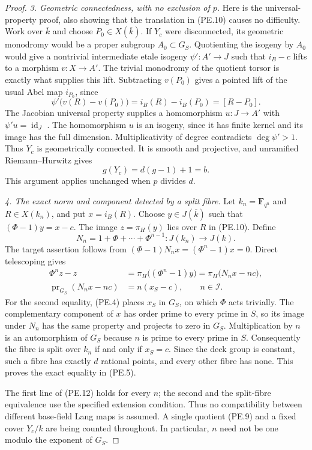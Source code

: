 \documentclass[11pt,a4paper]{article}
\begin{document}
\begin{proof}
\emph{3. Geometric connectedness, with no exclusion of $p$.}
Here is the universal-property proof, also showing that the
translation in (PE.10) causes no difficulty. Work over
$\overline k$ and choose $P_0\in X(\overline k)$.
If $Y_c$ were disconnected, its geometric monodromy would be a
proper subgroup $A_0\subset G_S$. Quotienting the isogeny by
$A_0$ would give a nontrivial intermediate etale isogeny
$\psi':A'\to J$ such that $i_B-c$ lifts to a morphism
$v:X\to A'$. The trivial monodromy of the quotient torsor is
exactly what supplies this lift. Subtracting $v(P_0)$ gives a
pointed lift of the usual Abel map $i_{P_0}$, since
\[
 \psi'\bigl(v(R)-v(P_0)\bigr)=i_B(R)-i_B(P_0)=[R-P_0].
\]
The Jacobian universal property supplies a homomorphism
$u:J\to A'$ with $\psi'u=\operatorname{id}_J$
\cite[Proposition~6.1, pp.~19--20]{MilneJV}.
The homomorphism $u$ is an isogeny, since it has finite kernel
and its image has the full dimension. Multiplicativity of degree
contradicts $\deg\psi'>1$. Thus $Y_c$ is geometrically connected.
It is smooth and projective, and unramified Riemann--Hurwitz gives
\[
                              g(Y_c)=d(g-1)+1=b.
 \tag{PE.11}
\]
This argument applies unchanged when $p$ divides $d$.

\emph{4. The exact norm and component detected by a split fibre.}
Let $k_n=\mathbf F_{q^n}$ and $R\in X(k_n)$, and put
$x=i_B(R)$. Choose $y\in J(\overline k)$ such that
$(\Phi-1)y=x-c$. The image $z=\pi_H(y)$ lies over $R$ in
(PE.10). Define
\[
 N_n=1+\Phi+\cdots+\Phi^{n-1}:J(k_n)\longrightarrow J(k).
\]
The target assertion follows from
$(\Phi-1)N_nx=(\Phi^n-1)x=0$. Direct telescoping gives
\[
 \begin{aligned}
 \Phi^n z-z
   &=\pi_H\bigl((\Phi^n-1)y\bigr)
     =\pi_H\bigl(N_nx-nc\bigr),\\
 \operatorname{pr}_{G_S}(N_nx-nc)
   &=n(x_S-c),\qquad n\in\mathcal I.
 \end{aligned}
 \tag{PE.12}
\]
For the second equality, (PE.4) places $x_S$ in $G_S$, on which
$\Phi$ acts trivially. The complementary component of $x$ has
order prime to every prime in $S$, so its image under $N_n$ has
the same property and projects to zero in $G_S$.
Multiplication by $n$ is an automorphism of $G_S$ because
$n$ is prime to every prime in $S$.
Consequently the fibre is split over $k_n$ if and only if
$x_S=c$. Since the deck group is constant, such a fibre has
exactly $d$ rational points, and every other fibre has none.
This proves the exact equality in (PE.5).

The first line of (PE.12) holds for every $n$; the second and the
split-fibre equivalence use the specified extension condition.
Thus no compatibility between different base-field Lang maps is
assumed. A single quotient (PE.9) and a fixed cover $Y_c/k$ are
being counted throughout. In particular, $n$ need not be one
modulo the exponent of $G_S$.


\end{proof}
\end{document}

